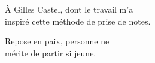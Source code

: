 À Gilles Castel, dont le travail m'a \\
inspiré cette méthode de prise de notes.

\vspace{1em}

Repose en paix, personne ne \\
mérite de partir si jeune.
